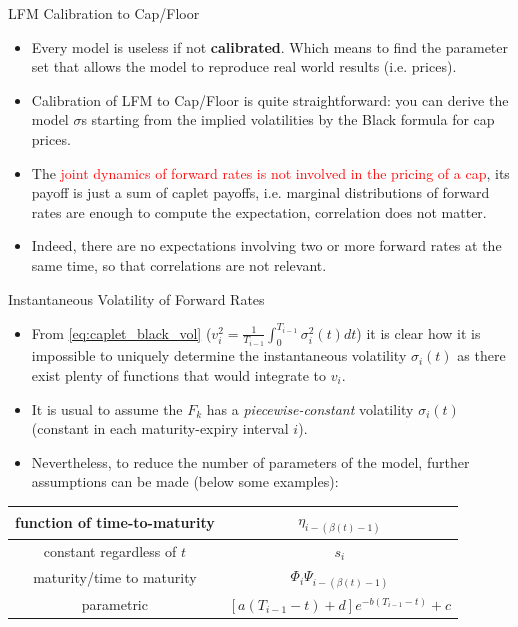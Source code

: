 \documentclass{beamer}
\begin{document}
\begin{frame}{LFM Calibration to Cap/Floor}
\begin{itemize}
	\item<1-> Every model is useless if not \textbf{calibrated}. Which means to find the parameter set that allows the model to reproduce real world results (i.e. prices).
	\item<2-> Calibration of LFM to Cap/Floor is quite straightforward: you can derive the model $\sigma$s starting from the implied volatilities by the Black formula for cap prices.
	\item<3-> The \textcolor{red}{joint dynamics of forward rates is not involved in the pricing of a cap}, its payoff is just a sum of caplet payoffs, i.e. marginal distributions of forward rates are enough to compute the expectation, correlation does not matter. 
	\item<4-> Indeed, there are no expectations involving two or more forward rates at the same time, so that correlations are not relevant.
\end{itemize}
\end{frame}

\begin{frame}{Instantaneous Volatility of Forward Rates}
\begin{itemize}
	\item From \cref{eq:caplet_black_vol} ($v_i^2 = \frac{1}{T_{i-1}}\int_0^{T_{i-1}}\sigma_i^2(t)dt
	$) it is clear how it is impossible to uniquely determine the instantaneous volatility $\sigma_i(t)$ as there exist plenty of functions that would integrate to $v_i$.
	\item It is usual to assume the $F_k$ has a \emph{piecewise-constant} volatility $\sigma_i(t)$ (constant in each maturity-expiry interval $i$).
	\item Nevertheless, to reduce the number of parameters of the model, further assumptions can be made (below some examples):
\end{itemize}
\begin{center}
\begin{tabular}{|c|c|}
\hline
function of time-to-maturity & $\eta_{i-(\beta(t)-1)}$ \\ \hline
constant regardless of $t$ & $s_i$ \\ \hline
maturity/time to maturity & $\Phi_i\Psi_{i-(\beta(t)-1)}$ \\ \hline
parametric & $[a(T_{i-1}-t) + d]e^{-b(T_{i-1}-t)} + c$ \\ \hline
\end{tabular} 
\end{center}
\end{frame}
\end{document}
